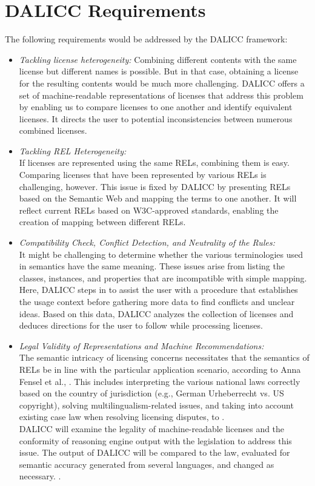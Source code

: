 \section{DALICC Requirements}
The following requirements would be addressed by the DALICC framework: 
\begin{itemize}
\item \textit{Tackling license heterogeneity:} 
Combining different contents with the same license but different names is possible. But in that case, obtaining a license for the resulting contents would be much more challenging. DALICC offers a set of machine-readable representations of licenses that address this problem by enabling us to compare licenses to one another and identify equivalent licenses. It directs the user to potential inconsistencies between numerous combined licenses.
\item \textit{Tackling REL Heterogeneity:} \\
If licenses are represented using the same RELs, combining them is easy. Comparing licenses that have been represented by various RELs is challenging, however. This issue is fixed by DALICC by presenting RELs based on the Semantic Web and mapping the terms to one another. It will reflect current RELs based on W3C-approved standards, enabling the creation of mapping between different RELs.
\item \textit{Compatibility Check, Conflict Detection, and Neutrality of the Rules:}\\
It might be challenging to determine whether the various terminologies used in semantics have the same meaning. These issues arise from listing the classes, instances, and properties that are incompatible with simple mapping. \\
Here, DALICC steps in to assist the user with a procedure that establishes the usage context before gathering more data to find conflicts and unclear ideas. Based on this data, DALICC analyzes the collection of licenses and deduces directions for the user to follow while processing licenses. \\
\item \textit{Legal Validity of Representations and Machine Recommendations:} \\
The semantic intricacy of licensing concerns necessitates that the semantics of RELs be in line with the particular application scenario, according to Anna Fensel et al., \cite{Anna}. This includes interpreting the various national laws correctly based on the country of jurisdiction (e.g., German Urheberrecht vs. US copyright), solving multilingualism-related issues, and taking into account existing case law when resolving licensing disputes, to \cite{Anna}.\\
DALICC will examine the legality of machine-readable licenses and the conformity of reasoning engine output with the legislation to address this issue. The output of DALICC will be compared to the law, evaluated for semantic accuracy generated from several languages, and changed as necessary. \cite{Anna}.
\end{itemize}
\\
